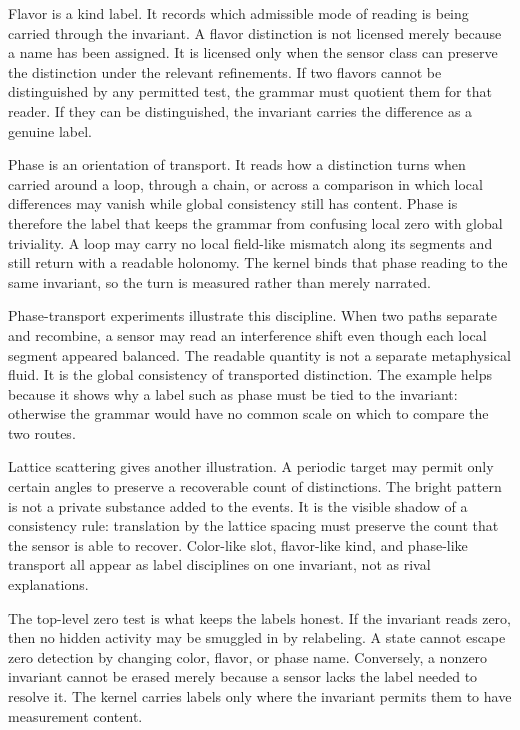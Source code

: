 Flavor is a kind label. It records which admissible mode of reading is being
carried through the invariant. A flavor distinction is not licensed merely
because a name has been assigned. It is licensed only when the sensor class
can preserve the distinction under the relevant refinements. If two flavors
cannot be distinguished by any permitted test, the grammar must quotient
them for that reader. If they can be distinguished, the invariant carries
the difference as a genuine label.

Phase is an orientation of transport. It reads how a distinction turns when
carried around a loop, through a chain, or across a comparison in which local
differences may vanish while global consistency still has content. Phase is
therefore the label that keeps the grammar from confusing local zero with
global triviality. A loop may carry no local field-like mismatch along its
segments and still return with a readable holonomy. The kernel binds that
phase reading to the same invariant, so the turn is measured rather than
merely narrated.

Phase-transport experiments illustrate this discipline. When two paths
separate and recombine, a sensor may read an interference shift even though
each local segment appeared balanced. The readable quantity is not a
separate metaphysical fluid. It is the global consistency of transported
distinction. The example helps because it shows why a label such as phase
must be tied to the invariant: otherwise the grammar would have no common
scale on which to compare the two routes.

Lattice scattering gives another illustration. A periodic target may permit
only certain angles to preserve a recoverable count of distinctions. The
bright pattern is not a private substance added to the events. It is the
visible shadow of a consistency rule: translation by the lattice spacing
must preserve the count that the sensor is able to recover. Color-like slot,
flavor-like kind, and phase-like transport all appear as label disciplines
on one invariant, not as rival explanations.

The top-level zero test is what keeps the labels honest. If the invariant
reads zero, then no hidden activity may be smuggled in by relabeling. A
state cannot escape zero detection by changing color, flavor, or phase name.
Conversely, a nonzero invariant cannot be erased merely because a sensor
lacks the label needed to resolve it. The kernel carries labels only where
the invariant permits them to have measurement content.

